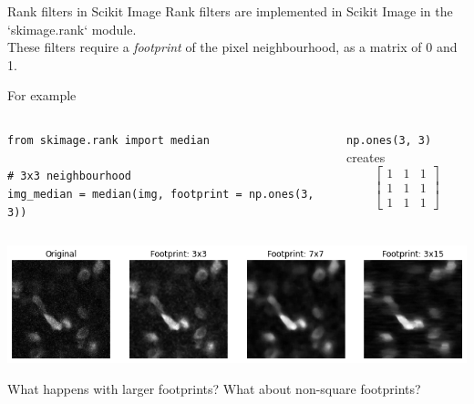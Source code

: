 \documentclass[9pt, aspectratio=169]{beamer}
\begin{document}
\begin{frame}
    {Rank filters in Scikit Image}
    Rank filters are implemented in Scikit Image in the `skimage.rank` module.\\
    These filters require a \textit{footprint} of the pixel neighbourhood, as a matrix of 0 and 1.

    For example

    \begin{columns}
        \begin{column}{.65\textwidth}
            \begin{codebox}
                \texttt{from skimage.rank import median\\
                    \\
                    \# 3x3 neighbourhood\\
                    img\_median = median(img, footprint = \texttt{np.ones(3, 3)})
                }
            \end{codebox}
        \end{column}
        \begin{column}{.35\textwidth}
            \centering
            \texttt{np.ones(3, 3)} creates
            $$\begin{bmatrix}1&1&1\\1&1&1\\1&1&1\end{bmatrix}$$
        \end{column}
    \end{columns}
    \centering
    \includegraphics[width=.85\textwidth]{median_filter_different_footprints.png}

    \pause
    What happens with larger footprints? What about non-square footprints?
\end{frame}
\end{document}
